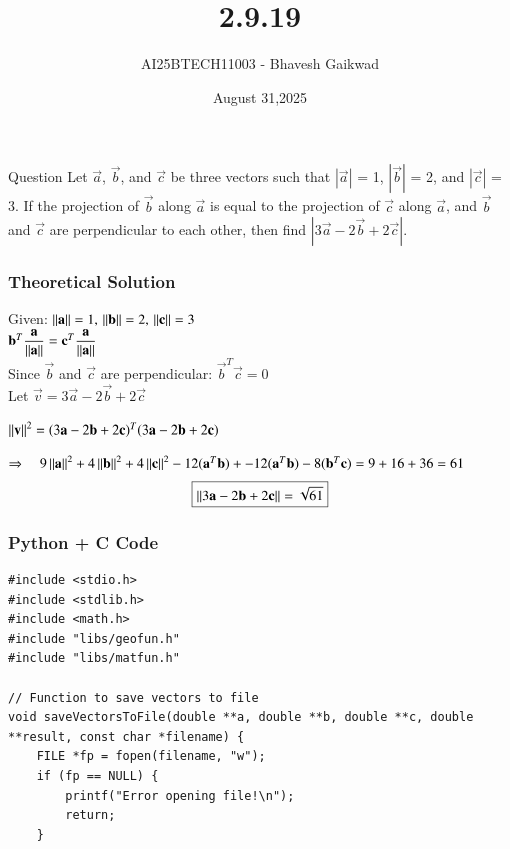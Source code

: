 \documentclass{beamer}
\title
{2.9.19}
\date{August 31,2025}
\author 
{AI25BTECH11003 - Bhavesh Gaikwad}
\begin{document}
\frame{\titlepage}
\begin{frame}{Question}
 Let $\overrightarrow{a}$,
$\overrightarrow{b}$, and $\overrightarrow{c}$ be three vectors such that $|\overrightarrow{a}|$ = 1, $|\overrightarrow{b}|$ = 2, and $|\overrightarrow{c}|$ = 3. If the
projection of $\overrightarrow{b}$ along $\overrightarrow{a}$ is equal to the projection of $\overrightarrow{c}$ along $\overrightarrow{a}$, and $\overrightarrow{b}$ and $\overrightarrow{c}$ are perpendicular to each other, then find $|3\overrightarrow{a} - 2\overrightarrow{b} + 2\overrightarrow{c}|$.
\end{frame}


\begin{frame}[fragile]
    \frametitle{Theoretical Solution}
Given: $\left\lVert\mathbf{a}\right\rVert = 1, \, \left\lVert\mathbf{b}\right\rVert = 2, \, \left\lVert\mathbf{c}\right\rVert = 3$\\

$\mathbf{b}^T\dfrac{\mathbf{a}}{\left\lVert\mathbf{a}\right\rVert} = \mathbf{c}^T\dfrac{\mathbf{a}}{\left\lVert\mathbf{a}\right\rVert}$\\

Since $\vec{b}$ and $\vec{c}$ are perpendicular: $\vec{b}^T\vec{c} = 0$ \\

Let $\vec{v} = 3\vec{a} - 2\vec{b} + 2\vec{c}$

$\left\lVert\mathbf{v}\right\rVert^2 = (3\mathbf{a} - 2\mathbf{b} + 2\mathbf{c})^T(3\mathbf{a} - 2\mathbf{b} + 2\mathbf{c})$

$\Rightarrow \quad 9\left\lVert\mathbf{a}\right\rVert^2 + 4\left\lVert\mathbf{b}\right\rVert^2 + 4\left\lVert\mathbf{c}\right\rVert^2 -12(\mathbf{a}^T\mathbf{b}) + -12(\mathbf{a}^T\mathbf{b}) - 8(\mathbf{b}^T\mathbf{c})
= 9 + 16 + 36 = 61$
\begin{align}
\centering
\boxed{\norm{3\vec{a} - 2\vec{b} + 2\vec{c}} = \sqrt{61}}
\end{align}
\end{frame}


\begin{frame}[fragile]
    \frametitle{Python + C Code}
    \begin{lstlisting}
#include <stdio.h>
#include <stdlib.h>
#include <math.h>
#include "libs/geofun.h"
#include "libs/matfun.h"

// Function to save vectors to file
void saveVectorsToFile(double **a, double **b, double **c, double **result, const char *filename) {
    FILE *fp = fopen(filename, "w");
    if (fp == NULL) {
        printf("Error opening file!\n");
        return;
    }
    \end{lstlisting}
\end{frame}
\end{document}
